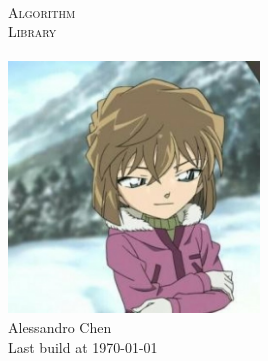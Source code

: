 \begin{titlepage}
  \pagestyle{empty}

  \begin{center}
    ~\\[80pt]
    \fontsize{48pt}{\baselineskip}\selectfont  \textsc{Algorithm \\ Library}\\[8pt]
    ~\\[20pt]
    \includegraphics[width=0.5\textwidth]{avtor.jpeg}
    ~\\[20pt]
    \huge Alessandro Chen\\[8pt]
    \Large Last build at \today
  \end{center}
\end{titlepage}
\restoregeometry